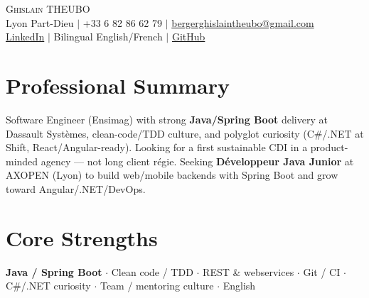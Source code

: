 \documentclass[letterpaper,10.5pt]{article}
\begin{document}
\begin{center}
{\Huge \scshape Ghislain THEUBO} \\ \vspace{2pt}
\small Lyon Part-Dieu $|$ +33 6 82 86 62 79 $|$ \href{mailto:bergerghislaintheubo@gmail.com}{bergerghislaintheubo@gmail.com} \\
\href{https://www.linkedin.com/in/berger-ghislain}{LinkedIn} $|$ Bilingual English/French $|$ \href{https://github.com/Bergerghislain}{GitHub}
\end{center}
\vspace{-6pt}
\section{Professional Summary}
\small{Software Engineer (Ensimag) with strong \textbf{Java/Spring Boot} delivery at Dassault Syst\`emes, clean-code/TDD culture, and polyglot curiosity (C\#/.NET at Shift, React/Angular-ready). Looking for a first sustainable CDI in a product-minded agency --- not long client r\'egie. Seeking \textbf{D\'eveloppeur Java Junior} at AXOPEN (Lyon) to build web/mobile backends with Spring Boot and grow toward Angular/.NET/DevOps.}

\section{Core Strengths}
\small{\textbf{Java / Spring Boot} $\cdot$ Clean code / TDD $\cdot$ REST \& webservices $\cdot$ Git / CI $\cdot$ C\#/.NET curiosity $\cdot$ Team / mentoring culture $\cdot$ English}
\end{document}
